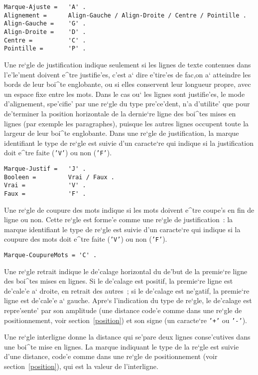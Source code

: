\begin{verbatim}
Marque-Ajuste =   'A' .
Alignement =      Align-Gauche / Align-Droite / Centre / Pointille .
Align-Gauche =    'G' .
Align-Droite =    'D' .
Centre =          'C' .
Pointille =       'P' .
\end{verbatim}

Une re`gle de justification indique seulement si les lignes de texte contenues
dans l'e'le'ment doivent e^tre justifie'es, c'est a` dire e'tire'es de fac,on a`
atteindre les bords de leur boi^te englobante, ou si elles conservent leur
longueur propre, avec un espace fixe entre les mots. Dans le cas ou` les
lignes sont justifie'es, le mode d'alignement, spe'cifie' par une re`gle du type
pre'ce'dent, n'a d'utilite' que pour de'terminer la position horizontale de la
dernie`re ligne des boi^tes mises en lignes (par exemple les paragraphes),
puisque les autres lignes occupent toute la largeur de leur boi^te
englobante.
Dans une re`gle de justification, la marque identifiant le type de re`gle est
suivie d'un caracte`re qui indique si la justification doit e^tre faite
({\tt 'V'}) ou non ({\tt 'F'}).

\begin{verbatim}
Marque-Justif =   'J' .
Booleen =         Vrai / Faux .
Vrai =            'V' .
Faux =            'F' .
\end{verbatim}

Une re`gle de coupure des mots indique si les mots doivent e^tre coupe's en
fin de ligne ou non. Cette re`gle est forme'e comme une re`gle de
justification~: la marque identifiant le type de re`gle est suivie d'un
caracte`re qui indique si la coupure des mots doit e^tre faite
({\tt 'V'}) ou non ({\tt 'F'}).

\begin{verbatim}
Marque-CoupureMots = 'C' .
\end{verbatim}

Une re`gle retrait indique le de'calage horizontal du de'but de la premie`re
ligne des boi^tes mises en lignes. Si le de'calage est positif, la premie`re
ligne est de'cale'e a` droite, en retrait des autres~; si le de'calage est
ne'gatif, la premie`re ligne est de'cale'e a` gauche. Apre`s l'indication du type
de re`gle, le de'calage est repre'sente' par son amplitude (une distance
code'e comme dans une re`gle de positionnement, voir section~\ref{position})
et son signe (un caracte`re {\tt '+'} ou {\tt '-'}).

Une re`gle interligne donne la distance qui se'pare deux lignes conse'cutives
dans une boi^te mise en lignes. La marque indiquant le type de la re`gle est
suivie d'une distance, code'e comme dans une re`gle de positionnement
(voir section~\ref{position}), qui est la valeur de l'interligne.

